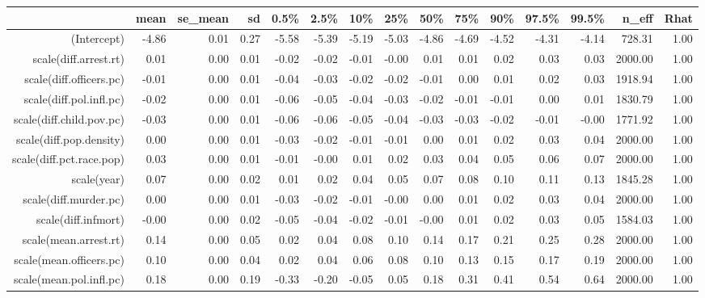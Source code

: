 \begin{table}[ht]
\centering
\begin{tabular}{rrrrrrrrrrrrrrr}
  \hline
 & mean & se\_mean & sd & 0.5\% & 2.5\% & 10\% & 25\% & 50\% & 75\% & 90\% & 97.5\% & 99.5\% & n\_eff & Rhat \\ 
  \hline
(Intercept) & -4.86 & 0.01 & 0.27 & -5.58 & -5.39 & -5.19 & -5.03 & -4.86 & -4.69 & -4.52 & -4.31 & -4.14 & 728.31 & 1.00 \\ 
  scale(diff.arrest.rt) & 0.01 & 0.00 & 0.01 & -0.02 & -0.02 & -0.01 & -0.00 & 0.01 & 0.01 & 0.02 & 0.03 & 0.03 & 2000.00 & 1.00 \\ 
  scale(diff.officers.pc) & -0.01 & 0.00 & 0.01 & -0.04 & -0.03 & -0.02 & -0.02 & -0.01 & 0.00 & 0.01 & 0.02 & 0.03 & 1918.94 & 1.00 \\ 
  scale(diff.pol.infl.pc) & -0.02 & 0.00 & 0.01 & -0.06 & -0.05 & -0.04 & -0.03 & -0.02 & -0.01 & -0.01 & 0.00 & 0.01 & 1830.79 & 1.00 \\ 
  scale(diff.child.pov.pc) & -0.03 & 0.00 & 0.01 & -0.06 & -0.06 & -0.05 & -0.04 & -0.03 & -0.03 & -0.02 & -0.01 & -0.00 & 1771.92 & 1.00 \\ 
  scale(diff.pop.density) & 0.00 & 0.00 & 0.01 & -0.03 & -0.02 & -0.01 & -0.01 & 0.00 & 0.01 & 0.02 & 0.03 & 0.04 & 2000.00 & 1.00 \\ 
  scale(diff.pct.race.pop) & 0.03 & 0.00 & 0.01 & -0.01 & -0.00 & 0.01 & 0.02 & 0.03 & 0.04 & 0.05 & 0.06 & 0.07 & 2000.00 & 1.00 \\ 
  scale(year) & 0.07 & 0.00 & 0.02 & 0.01 & 0.02 & 0.04 & 0.05 & 0.07 & 0.08 & 0.10 & 0.11 & 0.13 & 1845.28 & 1.00 \\ 
  scale(diff.murder.pc) & 0.00 & 0.00 & 0.01 & -0.03 & -0.02 & -0.01 & -0.00 & 0.00 & 0.01 & 0.02 & 0.03 & 0.04 & 2000.00 & 1.00 \\ 
  scale(diff.infmort) & -0.00 & 0.00 & 0.02 & -0.05 & -0.04 & -0.02 & -0.01 & -0.00 & 0.01 & 0.02 & 0.03 & 0.05 & 1584.03 & 1.00 \\ 
  scale(mean.arrest.rt) & 0.14 & 0.00 & 0.05 & 0.02 & 0.04 & 0.08 & 0.10 & 0.14 & 0.17 & 0.21 & 0.25 & 0.28 & 2000.00 & 1.00 \\ 
  scale(mean.officers.pc) & 0.10 & 0.00 & 0.04 & 0.02 & 0.04 & 0.06 & 0.08 & 0.10 & 0.13 & 0.15 & 0.17 & 0.19 & 2000.00 & 1.00 \\ 
  scale(mean.pol.infl.pc) & 0.18 & 0.00 & 0.19 & -0.33 & -0.20 & -0.05 & 0.05 & 0.18 & 0.31 & 0.41 & 0.54 & 0.64 & 2000.00 & 1.00 \\ 

\end{tabular}
\end{table}
